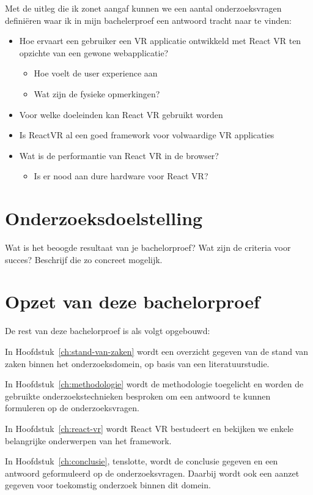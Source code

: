 Met de uitleg die ik zonet aangaf kunnen we een aantal onderzoeksvragen definiëren waar ik in mijn bachelerproef een antwoord tracht naar te vinden:
\begin{itemize}
  \item	Hoe ervaart een gebruiker een VR applicatie ontwikkeld met React VR ten opzichte van een gewone webapplicatie?
  \begin{itemize}
  \item	Hoe voelt de user experience aan
  \item	Wat zijn de fysieke opmerkingen?
  \end{itemize}
  \item	Voor welke doeleinden kan React VR gebruikt worden
  \item	Is ReactVR al een goed framework voor volwaardige VR applicaties
  \item	Wat is de performantie van React VR in de browser?
  \begin{itemize}
  \item Is er nood aan dure hardware voor React VR?
  \end{itemize}
\end{itemize}



\section{Onderzoeksdoelstelling}
\label{sec:onderzoeksdoelstelling}

Wat is het beoogde resultaat van je bachelorproef? Wat zijn de criteria voor succes? Beschrijf die zo concreet mogelijk.

\section{Opzet van deze bachelorproef}
\label{sec:opzet-bachelorproef}


De rest van deze bachelorproef is als volgt opgebouwd:

In Hoofdstuk~\ref{ch:stand-van-zaken} wordt een overzicht gegeven van de stand van zaken binnen het onderzoeksdomein, op basis van een literatuurstudie.

In Hoofdstuk~\ref{ch:methodologie} wordt de methodologie toegelicht en worden de gebruikte onderzoekstechnieken besproken om een antwoord te kunnen formuleren op de onderzoeksvragen.

In Hoofdstuk~\ref{ch:react-vr} wordt React VR bestudeert en bekijken we enkele belangrijke onderwerpen van het framework.

In Hoofdstuk~\ref{ch:conclusie}, tenslotte, wordt de conclusie gegeven en een antwoord geformuleerd op de onderzoeksvragen. Daarbij wordt ook een aanzet gegeven voor toekomstig onderzoek binnen dit domein.

